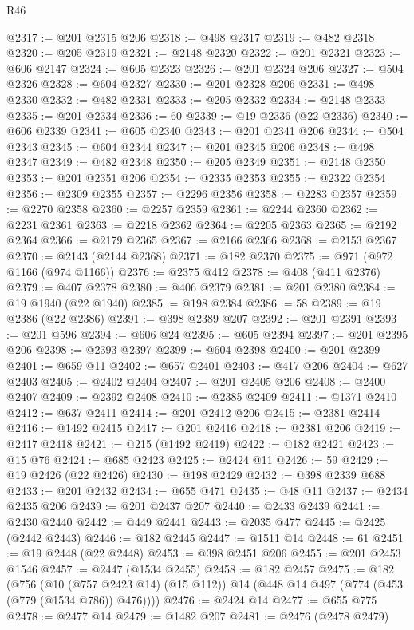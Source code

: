 \begin{lexlean}{R46}
\begin{coremodule}
@2317 := @201 @2315 @206
@2318 := @498 @2317
@2319 := @482 @2318
@2320 := @205 @2319
@2321 := @2148 @2320
@2322 := @201 @2321
@2323 := @606 @2147
@2324 := @605 @2323
@2326 := @201 @2324 @206
@2327 := @504 @2326
@2328 := @604 @2327
@2330 := @201 @2328 @206
@2331 := @498 @2330
@2332 := @482 @2331
@2333 := @205 @2332
@2334 := @2148 @2333
@2335 := @201 @2334
@2336 := 60
@2339 := @19 @2336 (@22 @2336)
@2340 := @606 @2339
@2341 := @605 @2340
@2343 := @201 @2341 @206
@2344 := @504 @2343
@2345 := @604 @2344
@2347 := @201 @2345 @206
@2348 := @498 @2347
@2349 := @482 @2348
@2350 := @205 @2349
@2351 := @2148 @2350
@2353 := @201 @2351 @206
@2354 := @2335 @2353
@2355 := @2322 @2354
@2356 := @2309 @2355
@2357 := @2296 @2356
@2358 := @2283 @2357
@2359 := @2270 @2358
@2360 := @2257 @2359
@2361 := @2244 @2360
@2362 := @2231 @2361
@2363 := @2218 @2362
@2364 := @2205 @2363
@2365 := @2192 @2364
@2366 := @2179 @2365
@2367 := @2166 @2366
@2368 := @2153 @2367
@2370 := @2143 (@2144 @2368)
@2371 := @182 @2370
@2375 := @971 (@972 @1166 (@974 @1166))
@2376 := @2375 @412
@2378 := @408 (@411 @2376)
@2379 := @407 @2378
@2380 := @406 @2379
@2381 := @201 @2380
@2384 := @19 @1940 (@22 @1940)
@2385 := @198 @2384
@2386 := 58
@2389 := @19 @2386 (@22 @2386)
@2391 := @398 @2389 @207
@2392 := @201 @2391
@2393 := @201 @596
@2394 := @606 @24
@2395 := @605 @2394
@2397 := @201 @2395 @206
@2398 := @2393 @2397
@2399 := @604 @2398
@2400 := @201 @2399
@2401 := @659 @11
@2402 := @657 @2401
@2403 := @417 @206
@2404 := @627 @2403
@2405 := @2402 @2404
@2407 := @201 @2405 @206
@2408 := @2400 @2407
@2409 := @2392 @2408
@2410 := @2385 @2409
@2411 := @1371 @2410
@2412 := @637 @2411
@2414 := @201 @2412 @206
@2415 := @2381 @2414
@2416 := @1492 @2415
@2417 := @201 @2416
@2418 := @2381 @206
@2419 := @2417 @2418
@2421 := @215 (@1492 @2419)
@2422 := @182 @2421
@2423 := @15 @76
@2424 := @685 @2423
@2425 := @2424 @11
@2426 := 59
@2429 := @19 @2426 (@22 @2426)
@2430 := @198 @2429
@2432 := @398 @2339 @688
@2433 := @201 @2432
@2434 := @655 @471
@2435 := @48 @11
@2437 := @2434 @2435 @206
@2439 := @201 @2437 @207
@2440 := @2433 @2439
@2441 := @2430 @2440
@2442 := @449 @2441
@2443 := @2035 @477
@2445 := @2425 (@2442 @2443)
@2446 := @182 @2445
@2447 := @1511 @14
@2448 := 61
@2451 := @19 @2448 (@22 @2448)
@2453 := @398 @2451 @206
@2455 := @201 @2453 @1546
@2457 := @2447 (@1534 @2455)
@2458 := @182 @2457
@2475 := @182
    (@756
      (@10 (@757 @2423 @14) (@15 @112))
      @14
      (@448 @14 @497 (@774 (@453 (@779 (@1534 @786)) @476))))
@2476 := @2424 @14
@2477 := @655 @775
@2478 := @2477 @14
@2479 := @1482 @207
@2481 := @2476 (@2478 @2479)

\end{coremodule}
\end{lexlean}
